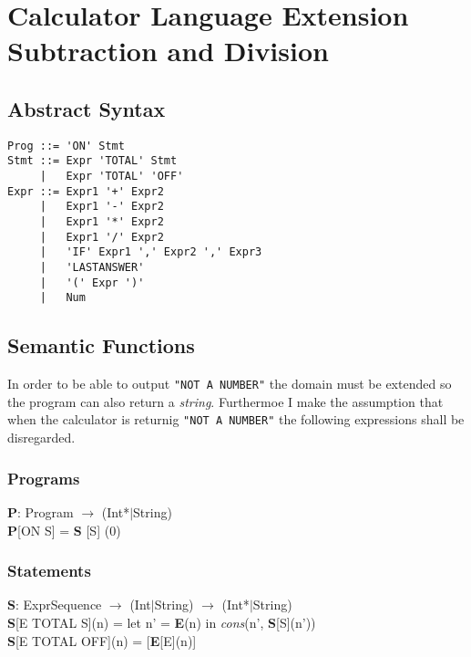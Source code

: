 \documentclass{report}
\begin{document}
	\section{Calculator Language Extension Subtraction  and Division}
	\startsection
		\subsection{Abstract Syntax}
		\startsubsection
			\begin{verbatim}
Prog ::= 'ON' Stmt
Stmt ::= Expr 'TOTAL' Stmt
     |   Expr 'TOTAL' 'OFF'
Expr ::= Expr1 '+' Expr2
     |   Expr1 '-' Expr2
     |   Expr1 '*' Expr2
     |   Expr1 '/' Expr2
     |   'IF' Expr1 ',' Expr2 ',' Expr3
     |   'LASTANSWER'
     |   '(' Expr ')'
     |   Num
			\end{verbatim}
		\closesection
		\subsection{Semantic Functions}
		\startsubsection
			In order to be able to output \texttt{"NOT A NUMBER"} the domain must be extended so the program can also return a \textit{string}. Furthermoe I make the assumption that when the calculator is returnig \texttt{"NOT A NUMBER"} the following expressions shall be disregarded.
			\subsubsection{Programs}
			\startsubsection
				\textbf{P}: Program $\rightarrow$ (Int*$|$String) \\
				\textbf{P}[ON S] = \textbf{S} [S] (0)
			\closesection
			\subsubsection{Statements}
			\startsubsection
				\textbf{S}: ExprSequence $\rightarrow$ (Int$|$String) $\rightarrow$ (Int*$|$String) \\
				\textbf{S}[E TOTAL S](n) = let n' = \textbf{E}(n) in \textit{cons}(n', \textbf{S}[S](n')) \\
				\textbf{S}[E TOTAL OFF](n) = [\textbf{E}[E](n)]
			\closesection
\end{document}
